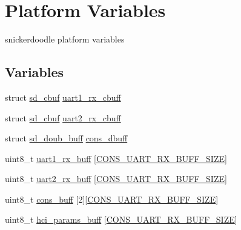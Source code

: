 \hypertarget{group___s_d___platform___variables}{}\section{Platform Variables}
\label{group___s_d___platform___variables}


snickerdoodle platform variables  


\subsection*{Variables}
\begin{DoxyCompactItemize}
\item 
struct \mbox{\hyperlink{structsd__cbuf}{sd\+\_\+cbuf}} \mbox{\hyperlink{group___s_d___platform___variables_gaf4d9d903e4183910ee6764d902948a15}{uart1\+\_\+rx\+\_\+cbuff}}
\item 
struct \mbox{\hyperlink{structsd__cbuf}{sd\+\_\+cbuf}} \mbox{\hyperlink{group___s_d___platform___variables_ga6727cd344d3e2e695b8a5aff466c529b}{uart2\+\_\+rx\+\_\+cbuff}}
\item 
struct \mbox{\hyperlink{structsd__doub__buff}{sd\+\_\+doub\+\_\+buff}} \mbox{\hyperlink{group___s_d___platform___variables_gab1427a377589df62b3cedc5dae7d1d7a}{cons\+\_\+dbuff}}
\item 
uint8\+\_\+t \mbox{\hyperlink{group___s_d___platform___variables_ga51337e7af0399a1e581d3d5f4f36e339}{uart1\+\_\+rx\+\_\+buff}} \mbox{[}\mbox{\hyperlink{group___s_d___platform___defines_gaf42bf8bfc63a6cca851012eeb8e25b52}{C\+O\+N\+S\+\_\+\+U\+A\+R\+T\+\_\+\+R\+X\+\_\+\+B\+U\+F\+F\+\_\+\+S\+I\+ZE}}\mbox{]}
\item 
uint8\+\_\+t \mbox{\hyperlink{group___s_d___platform___variables_ga3c26ef62b04f8b01eb21a42368e16071}{uart2\+\_\+rx\+\_\+buff}} \mbox{[}\mbox{\hyperlink{group___s_d___platform___defines_gaf42bf8bfc63a6cca851012eeb8e25b52}{C\+O\+N\+S\+\_\+\+U\+A\+R\+T\+\_\+\+R\+X\+\_\+\+B\+U\+F\+F\+\_\+\+S\+I\+ZE}}\mbox{]}
\item 
uint8\+\_\+t \mbox{\hyperlink{group___s_d___platform___variables_ga3806775e16d4988e597b07388bf0c26d}{cons\+\_\+buff}} \mbox{[}2\mbox{]}\mbox{[}\mbox{\hyperlink{group___s_d___platform___defines_gaf42bf8bfc63a6cca851012eeb8e25b52}{C\+O\+N\+S\+\_\+\+U\+A\+R\+T\+\_\+\+R\+X\+\_\+\+B\+U\+F\+F\+\_\+\+S\+I\+ZE}}\mbox{]}
\item 
uint8\+\_\+t \mbox{\hyperlink{group___s_d___platform___variables_gab7c02f3f6c00933734e1e19e7d2f99d8}{hci\+\_\+params\+\_\+buff}} \mbox{[}\mbox{\hyperlink{group___s_d___platform___defines_gaf42bf8bfc63a6cca851012eeb8e25b52}{C\+O\+N\+S\+\_\+\+U\+A\+R\+T\+\_\+\+R\+X\+\_\+\+B\+U\+F\+F\+\_\+\+S\+I\+ZE}}\mbox{]}
\end{DoxyCompactItemize}


